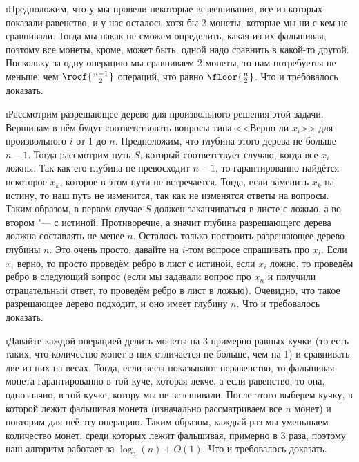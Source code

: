 \i Предположим, что у мы провели некоторые всзвешивания, все из которых показали равенство, и у нас осталось хотя бы 2 монеты, которые мы ни с кем не сравнивали. Тогда мы накак не сможем определить, какая из их фальшивая, поэтому все монеты, кроме, может быть, одной надо сравнить в какой-то другой. Поскольку за одну операцию мы сравниваем 2 монеты, то нам потребуется не меньше, чем $\roof{\frac{n-1}{2}}$ операций, что равно $\floor{\frac{n}{2}}$. Что и требовалось доказать.

\i Рассмотрим разрешающее дерево для произвольного решения этой задачи. Вершинам в нём будут соответствовать вопросы типа <<Верно ли $x_i$>> для произвольного $i$ от 1 до $n$. Предположим, что глубина этого дерева не больше $n-1$. Тогда рассмотрим путь $S$, который соответствует случаю, когда все $x_i$ ложны. Так как его глубина не превосходит $n-1$, то гарантированно найдётся некоторое $x_k$, которое в этом пути не встречается. Тогда, если заменить $x_k$ на истину, то наш путь не изменится, так как не изменятся ответы на вопросы. Таким образом, в первом случае $S$ должен заканчиваться в листе с ложью, а во втором "--- с истиной. Противоречие, а значит глубина разрешающего дерева должна составлять не менее $n$. Осталось только построить разрешающее дерево глубины $n$. Это очень просто, давайте на $i$-том вопросе спрашивать про $x_i$. Если $x_i$ верно, то просто проведём ребро в лист с истиной, если $x_i$ ложно, то проведём ребро в следующий вопрос (если мы задавали вопрос про $x_n$ и получили отрацательный ответ, то проведём ребро в лист в ложью). Очевидно, что такое разрешающее дерево подходит, и оно имеет глубину $n$. Что и требовалось доказать.

\i Давайте каждой операцией делить монеты на 3 примерно равных кучки (то есть таких, что количество монет в них отличается не больше, чем на 1) и сравнивать две из них на весах. Тогда, если весы показывают неравенство, то фальшивая монета гарантированно в той куче, которая лекче, а если равенство, то она, однозначно, в той кучке, котору мы не всзешивали. После этого выберем кучку, в которой лежит фальшивая монета (изначально рассматриваем все $n$ монет) и повторим для неё эту операцию. Таким образом, каждый раз мы уменьшаем количество монет, среди которых лежит фальшивая, примерно в 3 раза, поэтому наш алгоритм работает за $\log_3(n) + O(1)$. Что и требовалось доказать.

